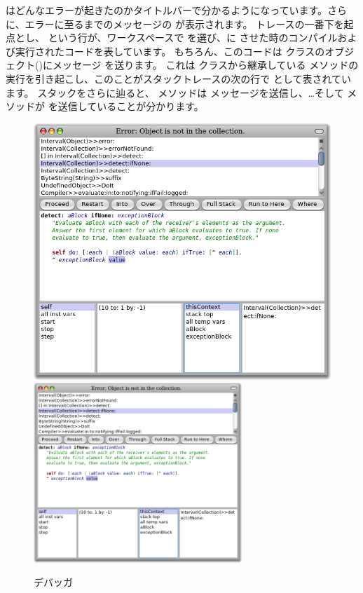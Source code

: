 \documentclass[a4paper,10pt,twoside]{book}
\begin{document}
 はどんなエラーが起きたのかタイトルバーで分かるようになっています。さらに、エラーに至るまでのメッセージの  が表示されます。
トレースの一番下を起点とし、  という行が、ワークスペースで  を選び、\pharo に  させた時のコンパイルおよび実行されたコードを表しています。
もちろん、このコードは  クラスのオブジェクト()にメッセージ  を送ります。
これは  クラスから継承している  メソッドの実行を引き起こし、このことがスタックトレースの次の行で  として表されています。
スタックをさらに辿ると、 メソッドは  メッセージを送信し、\ldots そして  メソッドが  を送信していることが分かります。

\begin{figure}[btp]
\begin{center}
\ifluluelse
{\includegraphics[width=\textwidth]{debuggerDetectIfNone}}
{\includegraphics[width=0.7\textwidth]{debuggerDetectIfNone}}
\end{center}
\caption{デバッガ}
\end{figure}
\end{document}
